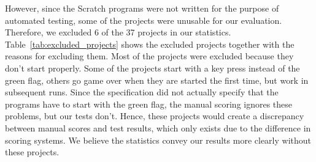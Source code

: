 However, since the Scratch programs were not written for the purpose of automated testing,
some of the projects were unusable for our evaluation.
Therefore, we excluded $6$ of the 37 projects in our statistics.
Table~\ref{tab:excluded_projects} shows the excluded projects together with the reasons for excluding them.
Most of the projects were excluded because they don't start properly.
Some of the projects start with a key press instead of the green flag,
others go game over when they are started the first time, but work in subsequent runs.
Since the specification did not actually specify that the programs have to start with the green flag,
the manual scoring ignores these problems, but our tests don't.
Hence, these projects would create a discrepancy between manual scores and test results,
which only exists due to the difference in scoring systems.
We believe the statistics convey our results more clearly without these projects.

